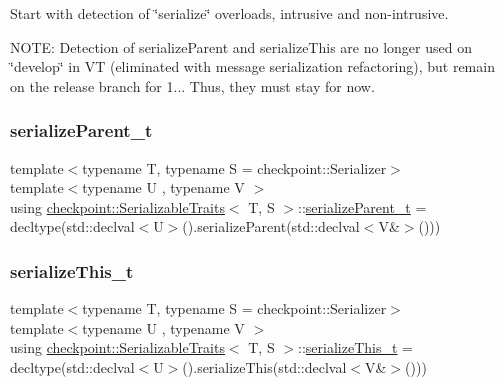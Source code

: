 Start with detection of \char`\"{}serialize\char`\"{} overloads, intrusive and non-\/intrusive.

N\+O\+TE\+: Detection of {\ttfamily serialize\+Parent} and {\ttfamily serialize\+This} are no longer used on \char`\"{}develop\char`\"{} in VT (eliminated with message serialization refactoring), but remain on the release branch for 1... Thus, they must stay for now. \mbox{\label{structcheckpoint_1_1_serializable_traits_a38585e5b9aa0653c08ff48504e922ad5}} 
\subsubsection{\texorpdfstring{serialize\+Parent\+\_\+t}{serializeParent\_t}}
{\footnotesize\ttfamily template$<$typename T, typename S = checkpoint\+::\+Serializer$>$ \\
template$<$typename U , typename V $>$ \\
using \hyperlink{structcheckpoint_1_1_serializable_traits}{checkpoint\+::\+Serializable\+Traits}$<$ T, S $>$\+::\hyperlink{structcheckpoint_1_1_serializable_traits_a38585e5b9aa0653c08ff48504e922ad5}{serialize\+Parent\+\_\+t} =  decltype(std\+::declval$<$U$>$().serialize\+Parent(std\+::declval$<$V\&$>$()))}

\mbox{\label{structcheckpoint_1_1_serializable_traits_ac81eb64532a65d97dc995e582ef708ad}} 
\subsubsection{\texorpdfstring{serialize\+This\+\_\+t}{serializeThis\_t}}
{\footnotesize\ttfamily template$<$typename T, typename S = checkpoint\+::\+Serializer$>$ \\
template$<$typename U , typename V $>$ \\
using \hyperlink{structcheckpoint_1_1_serializable_traits}{checkpoint\+::\+Serializable\+Traits}$<$ T, S $>$\+::\hyperlink{structcheckpoint_1_1_serializable_traits_ac81eb64532a65d97dc995e582ef708ad}{serialize\+This\+\_\+t} =  decltype(std\+::declval$<$U$>$().serialize\+This(std\+::declval$<$V\&$>$()))}

